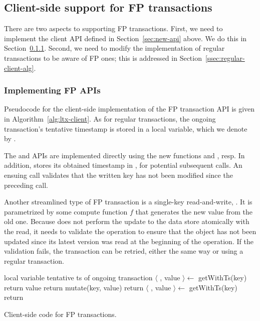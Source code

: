\subsection{Client-side support for FP transactions} \label{ssec:lc-client}

There are two aspects to supporting FP transactions. First, we need to implement the client API defined in Section~\ref{sec:new-api} above.
We do this in Section~\ref{ssec:local-client-alg}. Second, we need to modify the implementation of regular transactions to be aware of 
FP ones; this is addressed in Section~\ref{ssec:regular-client-alg}.

\subsubsection{Implementing FP APIs} \label{ssec:local-client-alg}

Pseudocode for the client-side implementation of the FP transaction API is given in  Algorithm~\ref{alg:ltx-client}. 
As for regular transactions, the ongoing transaction's tentative timestamp is stored in a local variable,
which we denote by . 

The 
 and  APIs are implemented directly using the new functions  and , resp.
In addition,  stores its obtained timestamp in  ,  for potential subsequent  calls.
An ensuing  call validates that the written key has not been modified since the preceding  call.


 Another streamlined type of FP transaction is a single-key read-and-write,  . It is
parametrized by some compute function $f$ that generates the new value from the old one.
Because  does not perform the update to the data store atomically
with the read, it needs to validate the  operation to ensure that the object
has not been updated since its latest version was read at the beginning of the
operation. If the validation fails, the transaction can be retried, either the
same way or using a regular transaction.


\begin{algorithm}[htb]
\begin{algorithmic}
\State local variable  \Comment tentative ts of ongoing transaction
\Statex
{} 
\State $\langle$ , value  $\rangle \leftarrow$ getWithTs(key)
\State  return value
\EndProcedure
%
\Statex
{} 
\State  return mutate(key, value)
\EndProcedure
%
 \Statex
{} 
\State return 
\EndProcedure
%
 \Statex
{} 
\State $\langle$ , value $\rangle \leftarrow$ getWithTs(key)
\State  return 
\EndProcedure
\end{algorithmic}
\caption{Client-side code for FP transactions.}
\label{alg:ltx-client}
\end{algorithm}

